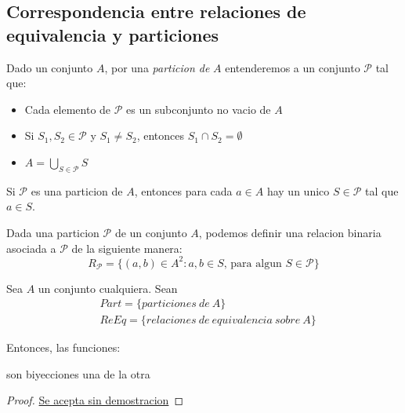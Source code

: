 \subsection{Correspondencia entre relaciones de equivalencia y particiones}
\begin{definition}
  Dado un conjunto $A$, por una \emph{particion de } $A$ entenderemos a un conjunto $\mathcal{P}$ tal que:
  \begin{itemize}
    \item Cada elemento de $\mathcal{P}$ es un subconjunto no vacio de $A$
    \item Si $S_1, S_2 \in \mathcal{P}$ y $S_1 \neq S_2$, entonces $S_1 \cap S_2 = \emptyset$
    \item $A = \bigcup_{S \in \mathcal{P}}S$
  \end{itemize}
\end{definition}
\begin{remark}
  Si $\mathcal{P}$ es una particion de $A$, entonces para cada $a \in A$ hay un unico $S \in \mathcal{P}$
  tal que $a \in S$.
\end{remark}
\begin{definition}
  Dada una particion $\mathcal{P}$ de un conjunto $A$, podemos definir una relacion binaria
  asociada a $\mathcal{P}$ de la siguiente manera:
  $$
  R_\mathcal{P} = \{(a, b) \in A^2 : a, b \in S\text{, para algun }S \in \mathcal{P}\}
  $$
\end{definition}

\begin{theorem}
  Sea $A$ un conjunto cualquiera. Sean
  \begin{equation*}\begin{split}
      &Part = \{particiones\ de\ A\}\\
      &ReEq = \{relaciones\ de\ equivalencia\ sobre\ A\}
  \end{split}\end{equation*}
  
  Entonces, las funciones:

  son biyecciones una de la otra
\end{theorem}

\begin{proof}
  \underline{Se acepta sin demostracion}
\end{proof}


